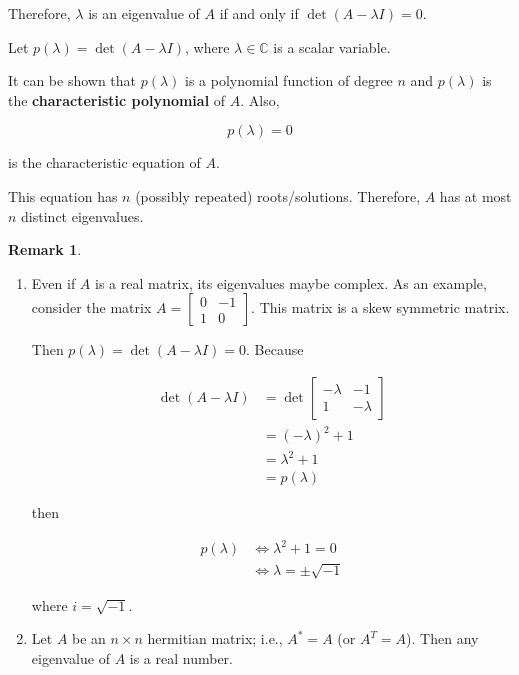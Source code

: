 \documentclass[12pt]{article}
\theoremstyle{definition}
\newtheorem*{remark}{Remark}
\begin{document}
Therefore, $\lambda$ is an eigenvalue of $A$ if and only if $\det(A - \lambda I) = 0$.

Let $p(\lambda) = \det(A - \lambda I)$, where $\lambda \in \mathbb{C}$ is a scalar
variable.

It can be shown that $p(\lambda)$ is a polynomial function of degree $n$ and $p(\lambda)$
is the \textbf{characteristic polynomial} of $A$. Also,

\[p(\lambda) = 0\]

is the characteristic equation of $A$.

This equation has $n$ (possibly repeated) roots/solutions. Therefore, $A$ has at most $n$
distinct eigenvalues.

\begin{remark}
\begin{enumerate}[label = (\alph*)]
\item Even if $A$ is a real matrix, its eigenvalues maybe complex. As an example, consider
the matrix $A = \begin{bmatrix} 0 & -1 \\ 1 & 0 \end{bmatrix}$. This matrix is a skew
symmetric matrix. 

Then $p(\lambda) = \det(A - \lambda I) = 0$. Because

\begin{align*}
\det(A - \lambda I) &= \det \begin{bmatrix} -\lambda & -1 \\ 1 & -\lambda \end{bmatrix} \\
&=(-\lambda)^2 + 1 \\
&= \lambda^2 + 1 \\
&= p(\lambda)
\end{align*}

then

\begin{align*}
p(\lambda) &\iff \lambda^2 + 1 = 0 \\
&\iff \lambda = \pm \sqrt{-1}
\end{align*}

where $i = \sqrt{-1}$.

\item Let $A$ be an $n \times n$ hermitian matrix; i.e., $A^* = A$ (or $A^T = A$). Then any
eigenvalue of $A$ is a real number.


\end{enumerate}
\end{remark}
\end{document}
